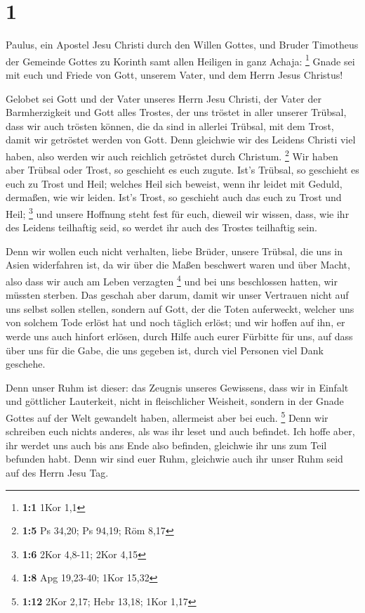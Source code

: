 \hypertarget{section}{%
\section{1}\label{section}}

 Paulus, ein Apostel Jesu Christi durch den Willen Gottes,
und Bruder Timotheus der Gemeinde Gottes zu Korinth samt allen Heiligen
in ganz Achaja: \footnote{\textbf{1:1} 1Kor 1,1}  Gnade
sei mit euch und Friede von Gott, unserem Vater, und dem Herrn Jesus
Christus!

 Gelobet sei Gott und der Vater unseres Herrn Jesu
Christi, der Vater der Barmherzigkeit und Gott alles Trostes,
 der uns tröstet in aller unserer Trübsal, dass wir auch
trösten können, die da sind in allerlei Trübsal, mit dem Trost, damit
wir getröstet werden von Gott.  Denn gleichwie wir des
Leidens Christi viel haben, also werden wir auch reichlich getröstet
durch Christum. \footnote{\textbf{1:5} Ps 34,20; Ps 94,19; Röm 8,17}
 Wir haben aber Trübsal oder Trost, so geschieht es euch
zugute. Ist's Trübsal, so geschieht es euch zu Trost und Heil; welches
Heil sich beweist, wenn ihr leidet mit Geduld, dermaßen, wie wir leiden.
Ist's Trost, so geschieht auch das euch zu Trost und Heil; \footnote{\textbf{1:6}
  2Kor 4,8-11; 2Kor 4,15}  und unsere Hoffnung steht fest
für euch, dieweil wir wissen, dass, wie ihr des Leidens teilhaftig seid,
so werdet ihr auch des Trostes teilhaftig sein.

 Denn wir wollen euch nicht verhalten, liebe Brüder,
unsere Trübsal, die uns in Asien widerfahren ist, da wir über die Maßen
beschwert waren und über Macht, also dass wir auch am Leben verzagten
\footnote{\textbf{1:8} Apg 19,23-40; 1Kor 15,32}  und bei
uns beschlossen hatten, wir müssten sterben. Das geschah aber darum,
damit wir unser Vertrauen nicht auf uns selbst sollen stellen, sondern
auf Gott, der die Toten auferweckt,  welcher uns von
solchem Tode erlöst hat und noch täglich erlöst; und wir hoffen auf ihn,
er werde uns auch hinfort erlösen,  durch Hilfe auch
eurer Fürbitte für uns, auf dass über uns für die Gabe, die uns gegeben
ist, durch viel Personen viel Dank geschehe.

 Denn unser Ruhm ist dieser: das Zeugnis unseres
Gewissens, dass wir in Einfalt und göttlicher Lauterkeit, nicht in
fleischlicher Weisheit, sondern in der Gnade Gottes auf der Welt
gewandelt haben, allermeist aber bei euch. \footnote{\textbf{1:12} 2Kor
  2,17; Hebr 13,18; 1Kor 1,17}  Denn wir schreiben euch
nichts anderes, als was ihr leset und auch befindet. Ich hoffe aber, ihr
werdet uns auch bis ans Ende also befinden, gleichwie ihr uns zum Teil
befunden habt.  Denn wir sind euer Ruhm, gleichwie auch
ihr unser Ruhm seid auf des Herrn Jesu Tag.

